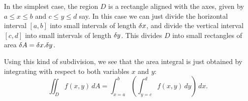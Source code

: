 \documentclass[reqno]{amsart}
\theoremstyle{definition}
\begin{document}
In the simplest case, the region $D$ is a rectangle aligned with the
axes, given by $a\leq x\leq b$ and $c\leq y\leq d$ say.  In this case
we can just divide the horizontal interval $[a,b]$ into small
intervals of length $\delta x$, and divide the vertical interval $[c,d]$
into small intervals of length $\delta y$.  This divides $D$ into small
rectangles of area $\delta A=\delta x.\delta y$.  

\renewcommand{\ss}      {\scriptstyle}

\begin{center}
\end{center}
Using this kind of subdivision, we see that the area integral is just
obtained by integrating with respect to both variables $x$ and $y$:
\[ \iint_D f(x,y)\,dA =
    \int_{x=a}^b \left(\int_{y=c}^d f(x,y)\,dy\right)\,dx.
\]
\end{document}
